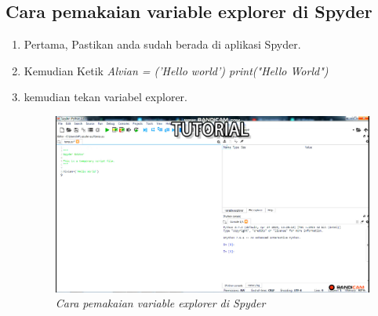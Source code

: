 \subsection{Cara pemakaian variable explorer di Spyder}
\begin{enumerate}

    \item Pertama, Pastikan anda sudah berada di aplikasi Spyder.
    \item Kemudian Ketik \textit{
    Alvian = ('Hello world')
    print("Hello World")}
\item kemudian tekan variabel explorer.
    \begin{figure}[!htbp]
    \centering
    \includegraphics[scale=0.2]{figures/26.PNG}
    \caption{\textit{Cara pemakaian variable explorer di Spyder}}
    \label{Figurepython}
    \end{figure}
\end{enumerate}
